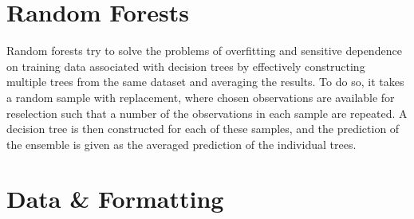 \section{Random Forests}
Random forests try to solve the problems of overfitting and sensitive dependence on training data associated with decision trees by effectively constructing multiple trees from the same dataset and averaging the results. To do so, it takes a random sample with replacement, where chosen observations are available for reselection such that a number of the observations in each sample are repeated. A decision tree is then constructed for each of these samples, and the prediction of the ensemble is given as the averaged prediction of the individual trees\cite{forestsk}.


\section{Data \& Formatting}
